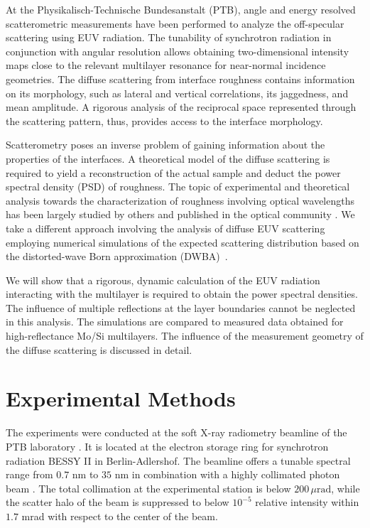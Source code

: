 \documentclass[twocolumn,osajnl,showpacs,superscriptaddress,11pt]{revtex4-1}
\begin{document}
At the Physikalisch-Technische Bundesanstalt (PTB), angle and energy resolved scatterometric measurements have been performed to analyze the off-specular scattering using EUV radiation. The tunability of synchrotron radiation in conjunction with angular resolution allows obtaining two-dimensional intensity maps close to the relevant multilayer resonance for near-normal incidence geometries. The diffuse scattering from interface roughness contains information on its morphology, such as lateral and vertical correlations, its jaggedness, and mean amplitude. A rigorous analysis of the reciprocal space represented through the scattering pattern, thus, provides access to the interface morphology.

Scatterometry poses an inverse problem of gaining information about the properties of the interfaces. A theoretical model of the diffuse scattering is required to yield a reconstruction of the actual sample and deduct the power spectral density (PSD) of roughness. The topic of experimental and theoretical analysis towards the characterization of roughness involving optical wavelengths has been largely studied by others and published in the optical community \cite{Amra:93_2,Amra:94, Elson:80, Elson:83, Schroder:11, Schroder:14}. We take a different approach involving the analysis of diffuse EUV scattering employing numerical simulations of the expected scattering distribution based on the distorted-wave Born approximation (DWBA)~\cite{PhysRevB.49.10668,PhysRevB.47.15896}.

We will show that a rigorous, dynamic calculation of the EUV radiation interacting with the multilayer is required to obtain the power spectral densities. The influence of multiple reflections at the layer boundaries cannot be neglected in this analysis. The simulations are compared to measured data obtained for high-reflectance Mo/Si multilayers. The influence of the measurement geometry of the diffuse scattering is discussed in detail.

\section{Experimental Methods} \label{sec:experimental} The experiments were conducted at the soft X-ray radiometry beamline of the PTB laboratory \cite{Beckhoff2009}. It is located at the electron storage ring for synchrotron radiation BESSY II in Berlin-Adlershof. The beamline offers a tunable spectral range from $0.7$ nm to $35$ nm in combination with a highly collimated photon beam \cite{ptbbeamline}. The total collimation at the experimental station is below $200\,\mu\text{rad}$, while the scatter halo of the beam is suppressed to below $10^{-5}$ relative intensity within $1.7$ mrad with respect to the center of the beam.
\end{document}
